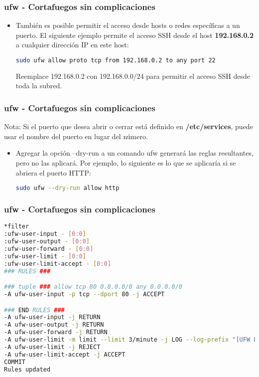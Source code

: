 \begin{frame}[fragile]
  \frametitle{ufw - Cortafuegos sin complicaciones}
  \begin{itemize}
    \item También es posible permitir el acceso desde hosts o redes
      específicas a un puerto. El siguiente ejemplo permite el acceso SSH
      desde el host \textbf{192.168.0.2} a cualquier dirección IP en
      este host:
      \begin{lstlisting}[language=Bash,numbers=none]
sudo ufw allow proto tcp from 192.168.0.2 to any port 22
      \end{lstlisting}
      Reemplace 192.168.0.2 con 192.168.0.0/24 para permitir el acceso
      SSH desde toda la subred.
  \end{itemize}
\end{frame}

\begin{frame}[fragile]
  \frametitle{ufw - Cortafuegos sin complicaciones}
  \begin{exampleblock}{Nota:}
    Si el puerto que desea abrir o cerrar está definido en
    \textbf{/etc/services},
    puede usar el nombre del puerto en lugar del número.
  \end{exampleblock}
  \begin{itemize}
    \item Agregar la opción –dry-run a un comando ufw generará las reglas
      resultantes, pero no las aplicará. Por ejemplo, lo siguiente es lo
      que se aplicaría si se abriera el puerto HTTP:
      \begin{lstlisting}[language=Bash,numbers=none]
sudo ufw --dry-run allow http
      \end{lstlisting}
  \end{itemize}
\end{frame}

\begin{frame}[fragile]
  \frametitle{ufw - Cortafuegos sin complicaciones}
  \begin{lstlisting}[language=Bash]
*filter
:ufw-user-input - [0:0]
:ufw-user-output - [0:0]
:ufw-user-forward - [0:0]
:ufw-user-limit - [0:0]
:ufw-user-limit-accept - [0:0]
### RULES ###

### tuple ### allow tcp 80 0.0.0.0/0 any 0.0.0.0/0
-A ufw-user-input -p tcp --dport 80 -j ACCEPT

### END RULES ###
-A ufw-user-input -j RETURN
-A ufw-user-output -j RETURN
-A ufw-user-forward -j RETURN
-A ufw-user-limit -m limit --limit 3/minute -j LOG --log-prefix "[UFW LIMIT]: "
-A ufw-user-limit -j REJECT
-A ufw-user-limit-accept -j ACCEPT
COMMIT
Rules updated
  \end{lstlisting}
\end{frame}

